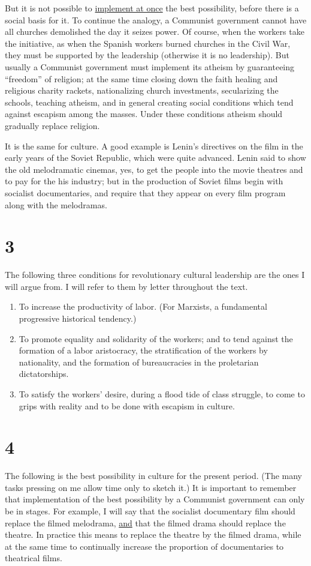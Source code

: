 But it is not possible to \uline{implement at once} the best possibility,
before there is a social basis for it. To continue the analogy, a Communist
government cannot have all churches demolished the day it seizes power. Of 
course, when the workers take the initiative, as when the Spanish workers 
burned churches in the Civil War, they must be supported by the leadership
(otherwise it is no leadership). But usually a Communist government must
implement its atheism by guaranteeing \enquote{freedom} of religion; at the same
time closing down the faith healing and religious charity rackets, 
nationalizing church investments, secularizing the schools, teaching atheism,
and in general creating social conditions which tend against escapism among the
masses. Under these conditions atheism should gradually replace religion.

It is the same for culture. A good example is Lenin's directives on the film in
the early years of the Soviet Republic, which were quite advanced. Lenin said to
show the old melodramatic cinemas, yes, to get the people into the movie theatres
and to pay for the his industry; but in the production of Soviet films begin with
socialist documentaries, and require that they appear on every film program along
with the melodramas. 

\section*{3}
The following three conditions for revolutionary cultural leadership are the ones
I will argue from. I will refer to them by letter throughout the text. 
\begin{enumerate}[label=\Alph*., nosep, itemsep=0.5em]
\item To increase the productivity of labor. (For Marxists, a fundamental progressive historical tendency.) 
\item To promote equality and solidarity of the workers; and to tend against the formation of a labor aristocracy, the stratification of the workers by nationality, and the formation of bureaucracies in the proletarian dictatorships. 
\item To satisfy the workers' desire, during a flood tide of class struggle, to come to grips with reality and to be done with escapism in culture. 
\end{enumerate}

\section*{4}
The following is the best possibility in culture for the present 
period. (The many tasks pressing on me allow time only to sketch it.) 
It is important to remember that implementation of the best possibility
by a Communist government can only be in stages. For example, I will say
that the socialist documentary film should replace the filmed melodrama,
\uline{and} that the filmed drama should replace the theatre. In practice this
means to replace the theatre by the filmed drama, while at the same time
to continually increase the proportion of documentaries to theatrical 
films. 


